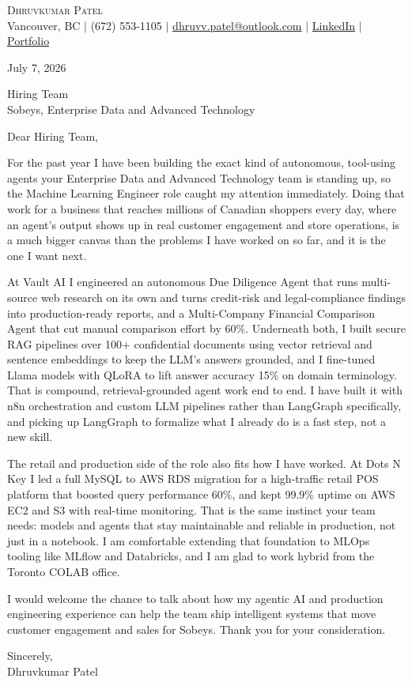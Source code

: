\documentclass[letterpaper,11pt]{article}
\begin{document}
\begin{center}
    {\Large \scshape Dhruvkumar Patel}\\[2pt]
    \small Vancouver, BC $|$ (672) 553-1105 $|$ \href{mailto:dhruvv.patel@outlook.com}{dhruvv.patel@outlook.com} $|$
    \href{https://www.linkedin.com/in/dhruvkumarpatell/}{LinkedIn} $|$ \href{https://dhruvvkumarpatel.vercel.app/}{Portfolio}
\end{center}

\vspace{8pt}
July 7, 2026

\vspace{4pt}
Hiring Team\\
Sobeys, Enterprise Data and Advanced Technology

\vspace{8pt}
Dear Hiring Team,

For the past year I have been building the exact kind of autonomous, tool-using agents your Enterprise Data and Advanced Technology team is standing up, so the Machine Learning Engineer role caught my attention immediately. Doing that work for a business that reaches millions of Canadian shoppers every day, where an agent's output shows up in real customer engagement and store operations, is a much bigger canvas than the problems I have worked on so far, and it is the one I want next.

At Vault AI I engineered an autonomous Due Diligence Agent that runs multi-source web research on its own and turns credit-risk and legal-compliance findings into production-ready reports, and a Multi-Company Financial Comparison Agent that cut manual comparison effort by 60\%. Underneath both, I built secure RAG pipelines over 100+ confidential documents using vector retrieval and sentence embeddings to keep the LLM's answers grounded, and I fine-tuned Llama models with QLoRA to lift answer accuracy 15\% on domain terminology. That is compound, retrieval-grounded agent work end to end. I have built it with n8n orchestration and custom LLM pipelines rather than LangGraph specifically, and picking up LangGraph to formalize what I already do is a fast step, not a new skill.

The retail and production side of the role also fits how I have worked. At Dots N Key I led a full MySQL to AWS RDS migration for a high-traffic retail POS platform that boosted query performance 60\%, and kept 99.9\% uptime on AWS EC2 and S3 with real-time monitoring. That is the same instinct your team needs: models and agents that stay maintainable and reliable in production, not just in a notebook. I am comfortable extending that foundation to MLOps tooling like MLflow and Databricks, and I am glad to work hybrid from the Toronto COLAB office.

I would welcome the chance to talk about how my agentic AI and production engineering experience can help the team ship intelligent systems that move customer engagement and sales for Sobeys. Thank you for your consideration.

\vspace{8pt}
Sincerely,\\
Dhruvkumar Patel
\end{document}
